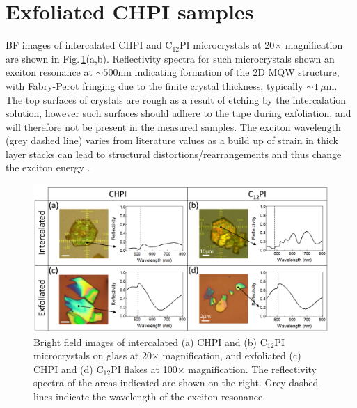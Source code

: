 \section{Exfoliated CHPI samples}
BF images of intercalated CHPI and C$_{12}$PI microcrystals at 20$\times$ magnification are shown in Fig.\,\ref{5Fig2}(a,b). Reflectivity spectra for such microcrystals shown an exciton resonance at $\sim500$nm indicating formation of the 2D MQW structure, with Fabry-Perot fringing due to the finite crystal thickness, typically $\sim1\,\mu$m. The top surfaces of crystals are rough as a result of etching by the intercalation solution, however such surfaces should adhere to the tape during exfoliation, and will therefore not be present in the measured samples. The exciton wavelength (grey dashed line) varies from literature values as a build up of strain in thick layer stacks can lead to structural distortions/rearrangements and thus change the exciton energy \cite{Saikumar2012, VijayaPrakash2009, Pradeesh2009b}. 
\begin{figure}[h!] 
\centering    
\includegraphics[width=\textwidth]{Fig2}
\caption[Intercalated and exfoliated perovskite microcrystals.]{Bright field images of intercalated (a) CHPI and (b) C$_{12}$PI microcrystals on glass at 20$\times$ magnification, and exfoliated (c) CHPI and (d) C$_{12}$PI flakes at 100$\times$ magnification. The reflectivity spectra of the areas indicated are shown on the right. Grey dashed lines indicate the wavelength of the exciton resonance.}
\label{5Fig2}
\end{figure}

